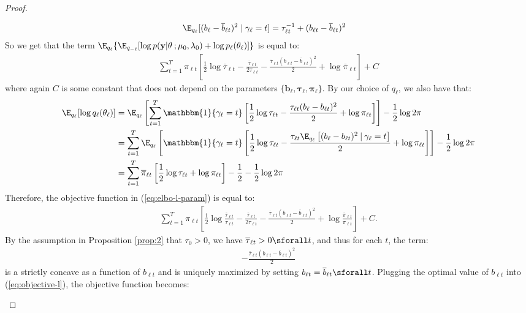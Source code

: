\begin{proof}
\begin{enumerate}[label=\roman*.]
\begin{align*}
    \E_{q_\ell}[(b_\ell - \overline{b}_{\ell t})^2\;|\;\gamma_\ell=t] &= \tau_{\ell t}^{-1} + (b_{\ell t}- \overline{b}_{\ell t})^2
\end{align*}
So we get that the term $\E_{q_\ell}\{\E_{q_{-\ell}}[\log p(\mathbf{y}| \theta\:; \mu_0,\lambda_0)+\log p_\ell(\theta_\ell)]\}$ is equal to:
\begin{align*}
    \sum_{t=1}^T \pi_{\ell t}\left[ \frac{1}{2}\log \overline{\tau}_{\ell t} - \frac{\overline{\tau}_{\ell t}}{2\tau_{\ell t}}- \frac{\overline{\tau}_{\ell t}(b_{\ell t}  - \overline{b}_{\ell t})^2}{2} + \log \overline{\pi}_{\ell t}\right] + C
\end{align*}
where again $C$ is some constant that does not depend on the parameters $\{\mathbf{b}_\ell, \boldsymbol{\tau}_\ell, \boldsymbol{\pi}_\ell\}$. By our choice of $q_\ell$, we also have that:
\begin{align*}
    \E_{q_\ell}[\log q_\ell(\theta_\ell)] &= \E_{q_\ell}\left[\sum_{t=1}^T \mathbbm{1}\{\gamma_\ell = t\}\left[\frac{1}{2}\log \tau_{\ell t} - \frac{\tau_{\ell t}(b_\ell - b_{\ell t})^2}{2} + \log \pi_{\ell t}\right]\right] - \frac{1}{2} \log 2\pi  \\
    &= \sum_{t=1}^T \E_{q_\ell}\left[\mathbbm{1}\{\gamma_\ell = t\}\left[\frac{1}{2}\log \tau_{\ell t} - \frac{\tau_{\ell t}\E_{q_\ell}\left[(b_\ell - b_{\ell t})^2\:|\: \gamma_{\ell} = t\right]}{2} + \log \pi_{\ell t}\right]\right] - \frac{1}{2} \log 2\pi  \\
    &= \sum_{t=1}^T \overline{\pi}_{\ell t}\left[\frac{1}{2}\log \tau_{\ell t} + \log \pi_{\ell t}\right] - \frac{1}{2} - \frac{1}{2} \log 2\pi 
\end{align*}
Therefore, the objective function in (\ref{eq:elbo-l-param}) is equal to:
\begin{align}
     \sum_{t=1}^T \pi_{\ell t}\left[ \frac{1}{2}\log \frac{\overline{\tau}_{\ell t}}{\tau_{\ell t}} - \frac{\overline{\tau}_{\ell t}}{2\tau_{\ell t}} - \frac{\overline{\tau}_{\ell t}(b_{\ell t}  - \overline{b}_{\ell t})^2}{2} + \log \frac{\overline{\pi}_{\ell t} }{\pi_{\ell t}}\right]+C.\label{eq:objective-l}
\end{align}
By the assumption in Proposition \ref{prop:2} that $\tau_{0} > 0$, we have $\overline{\tau}_{\ell t} > 0 \sforall t$, and thus for each $t$, the term:
\begin{align*}
    - \frac{\overline{\tau}_{\ell t}(b_{\ell t}  - \overline{b}_{\ell t})^2}{2}
\end{align*}
is a strictly concave as a function of $b_{\ell t}$ and is uniquely maximized by setting $b_{\ell t} = \overline{b}_{\ell t} \sforall t$. Plugging the optimal value of $b_{\ell t}$ into (\ref{eq:objective-l}), the objective function becomes: 

\end{enumerate}
\end{proof}
